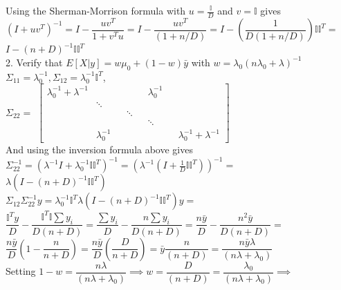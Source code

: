 \documentclass[18pt]{article}
\begin{document}
\begin{flushleft}
Using the Sherman-Morrison formula with $u=\frac{\mathbb{I}}{D}$ and $v=\mathbb{I}$ gives\\
\vspace{.4cm}
$\left(I+uv^T\right)^{-1}=I-\dfrac{uv^T}{1+v^T u}=I-\dfrac{uv^T}{\left(1+n/D\right)}=I-\left(\dfrac{1}{D(1+n/D)}\right) \mathbb{I}\mathbb{I}^T=$\\
$I-(n+D)^{-1} \mathbb{I}\mathbb{I}^T$\\
\vspace{.4cm}
2. Verify that $E[X|y]=w\mu_0+(1-w)\bar{y}$ with $w=\lambda_0(n\lambda_{0}+\lambda)^{-1}$\\
\vspace{.4cm}
$\Sigma_{11}=\lambda_0^{-1},\Sigma_{12}=\lambda_0^{-1} \mathbb{I}^T$,\\
\vspace{.4cm}
$\Sigma_{22}=$
$
\begin{bmatrix}
   \lambda_0^{-1}+\lambda^{-1} & & & & &\lambda_0^{-1}\\ 
   &   \ddots & & & \\
   &  &  & \ddots  \\
   &  &  &  & & \ddots &\\
   &\lambda_0^{-1} &  &  &  & & & \lambda_0^{-1}+\lambda^{-1}
\end{bmatrix}
$\\
\vspace{.4cm}
And using the inversion formula above gives\\
\vspace{.4cm}
$\Sigma_{22}^{-1}=\left(\lambda^{-1} I+\lambda_0^{-1} \mathbb{I}\mathbb{I}^T\right)^{-1}=\left(\lambda^{-1}(I+\frac{1}{D}\mathbb{I}\mathbb{I}^T)\right)^{-1}=$\\
$\lambda\left(I-(n+D)^{-1} \mathbb{I}\mathbb{I}^T\right)$\\
\vspace{.4cm}
$\Sigma_{12} \Sigma_{22}^{-1} y=\lambda_0^{-1} \mathbb{I}^T \lambda\left(I-(n+D)^{-1} \mathbb{I}\mathbb{I}^T \right)y=$\\
$\dfrac{\mathbb{I}^T y}{D}-\dfrac{\mathbb{I}^T \mathbb{I}\sum y_i}{D(n+D)}=\dfrac{\sum y_i}{D}-\dfrac{n \sum y_i}{D(n+D)}=\dfrac{n\bar{y}}{D}-\dfrac{n^2\bar{y}}{D(n+D)}=$\\
$\dfrac{n \bar{y}}{D}\left(1-\dfrac{n}{n+D}\right)=\dfrac{n \bar{y}}{D} \left(\dfrac{D}{n+D}\right)=\bar{y}\dfrac{n}{(n+D)}=\dfrac{n \bar{y}\lambda}{(n \lambda+\lambda_0)}$\\
\vspace{.4cm}
Setting $1-w=\dfrac{n \lambda}{(n \lambda+\lambda_0)} \implies w=\dfrac{D}{(n+D)}=\dfrac{\lambda_0}{(n\lambda+\lambda_0)} \implies$\\

\end{flushleft}
\end{document}
